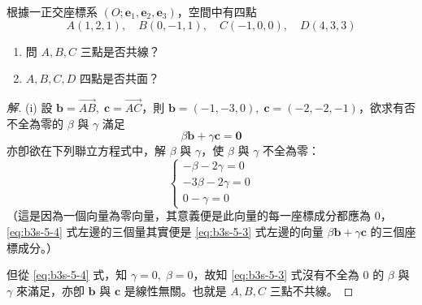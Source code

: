 \begin{example}[論例 1]
根據一正交座標系 $(O; \mathbf{e}_1, \mathbf{e}_2, \mathbf{e}_3)$，空間中有四點
\[ A(1, 2, 1),\quad B(0, -1, 1),\quad C(-1, 0, 0),\quad D(4, 3, 3) \]
\begin{enumerate}[label=(\roman*), leftmargin=2.5em]
  \item 問 $A, B, C$ 三點是否共線？
  \item $A, B, C, D$ 四點是否共面？
\end{enumerate}
\end{example}
\begin{proof}[解]
(i) 設 $\mathbf{b} = \vec{AB},\; \mathbf{c} = \vec{AC}$，則 $\mathbf{b} = (-1, -3, 0),\; \mathbf{c} = (-2, -2, -1)$，欲求有否不全為零的 $\beta$ 與 $\gamma$ 滿足
\begin{equation}
\beta \mathbf{b} + \gamma \mathbf{c} = \mathbf{0} \label{eq:b3s-5-3}
\end{equation}
亦卽欲在下列聯立方程式中，解 $\beta$ 與 $\gamma$，使 $\beta$ 與 $\gamma$ 不全為零：
\begin{equation}
\begin{cases}
-\beta - 2\gamma = 0 \\
-3\beta - 2\gamma = 0 \\
0 - \gamma = 0
\end{cases} \label{eq:b3s-5-4}
\end{equation}
（這是因為一個向量為零向量，其意義便是此向量的每一座標成分都應為 0，\eqref{eq:b3s-5-4} 式左邊的三個量其實便是 \eqref{eq:b3s-5-3} 式左邊的向量 $\beta \mathbf{b} + \gamma \mathbf{c}$ 的三個座標成分。）

但從 \eqref{eq:b3s-5-4} 式，知 $\gamma = 0,\; \beta = 0$，故知 \eqref{eq:b3s-5-3} 式沒有不全為 0 的 $\beta$ 與 $\gamma$ 來滿足，亦卽 $\mathbf{b}$ 與 $\mathbf{c}$ 是線性無關。也就是 $A, B, C$ 三點不共線。


\end{proof}
